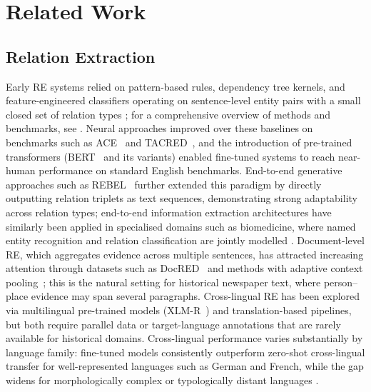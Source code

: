 \documentclass[
]{ceurart}
\theoremstyle{definition}
\begin{document}
\section{Related Work}\label{sec:related}

\subsection{Relation Extraction}

Early RE systems relied on pattern-based rules, dependency tree kernels, and feature-engineered classifiers operating on sentence-level entity pairs with a small closed set of relation types \citep{zhou-etal-2005-exploring}; for a comprehensive overview of methods and benchmarks, see \citet{zhao2024comprehensive}.
Neural approaches \citep{lin-etal-2016-neural} improved over these baselines on benchmarks such as ACE~\citep{doddington-etal-2004-automatic} and TACRED~\citep{stoica-etal-2021-re-tacred}, and the introduction of pre-trained transformers (BERT~\citep{devlin2019bert} and its variants) enabled fine-tuned systems to reach near-human performance on standard English benchmarks.
End-to-end generative approaches such as REBEL~\citep{huguet-cabot-navigli-2021-rebel-relation} further extended this paradigm by directly outputting relation triplets as text sequences, demonstrating strong adaptability across relation types; end-to-end information extraction architectures have similarly been applied in specialised domains such as biomedicine, where named entity recognition and relation classification are jointly modelled \citep{keinan2025named}.
Document-level RE, which aggregates evidence across multiple sentences, has attracted increasing attention through datasets such as DocRED~\citep{yao-etal-2019-docred} and methods with adaptive context pooling~\citep{zhou2021document}; this is the natural setting for historical newspaper text, where person--place evidence may span several paragraphs.
Cross-lingual RE has been explored via multilingual pre-trained models (XLM-R~\citep{conneau-etal-2020-unsupervised}) and translation-based pipelines, but both require parallel data or target-language annotations that are rarely available for historical domains.
Cross-lingual performance varies substantially by language family: fine-tuned models consistently outperform zero-shot cross-lingual transfer for well-represented languages such as German and French, while the gap widens for morphologically complex or typologically distant languages \citep{hennig2023multitacred,artetxe2020translation}.
\end{document}
